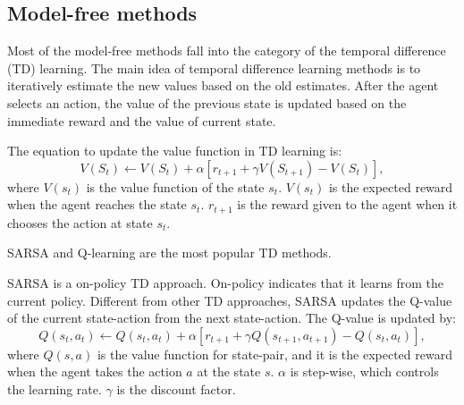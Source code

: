 \subsection{Model-free methods}
\label{se:modelfree}
Most of the model-free methods fall into the category of the temporal difference (TD)
learning. The main idea of temporal difference learning methods is to iteratively
estimate the new values based on the old estimates. After the agent selects an action,
the value of the previous state is updated based on the immediate reward and the 
value of current state.

The equation to update the value function in TD learning is:
\begin{displaymath}
   V(S_t) \leftarrow V(S_t) + \alpha [r_{t+1} + \gamma V(S_{t+1}) - V(S_t)],
\end{displaymath}
where $V(s_t)$ is the value function of the state $s_t$. $V(s_t)$ is the expected reward when
the agent reaches the state $s_t$. $r_{t+1}$ is the reward given to the agent when it chooses
the action at state $s_t$.

SARSA\cite{Rummery94} and Q-learning\cite{Watkins89} are the most popular TD methods.

SARSA is a on-policy TD approach. On-policy indicates that it learns from the current policy.
Different from other TD approaches, SARSA updates the Q-value of the current state-action from the next state-action.
The Q-value is updated by:
\begin{displaymath}
    Q(s_t, a_t) \leftarrow Q(s_t, a_t) + \alpha [r_{t+1} + \gamma Q(s_{t+1}, a_{t+1})-Q(s_t, a_t)],
\end{displaymath}
where $Q(s, a)$ is the value function for state-pair, and it is the expected reward when the agent takes
the action $a$ at the state $s$. $\alpha$ is step-wise, which controls the learning rate. 
$\gamma$ is the discount factor.


